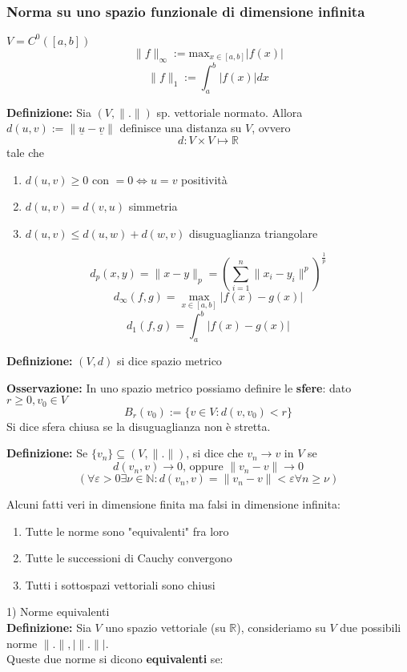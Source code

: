 \documentclass[a4paper]{article}
\newcommand{\R}{\mathbb{R}}
\newcommand{\N}{\mathbb{N}}
\begin{document}
\subsubsection{Norma su uno spazio funzionale di dimensione infinita}
$V=C^0([a,b])$
\[\|f\|_\infty:=\text{max}_{x\in[a,b]}|f(x)|\]
\[\|f\|_1:=\int_{a}^{b} |f(x)|dx\]
\begin{tcolorbox}	
\textbf{Definizione:} Sia $(V,\|.\|)$ sp. vettoriale normato. Allora $d(u,v):=\|\underline{u}-\underline{v}\|$ definisce una distanza su $V$, ovvero
\[d:V\times V\mapsto \R\]
tale che
\begin{enumerate}
	\item $d(u,v)\ge 0$ con $=0\iff u=v$ positività
	\item $d(u,v)=d(v,u)$ simmetria
	\item $d(u,v)\le d(u,w)+d(w,v)$ disuguaglianza triangolare
\end{enumerate}
\end{tcolorbox}
\[d_p(x,y)=\|x-y\|_p=(\sum_{i=1}^{n} \|x_i-y_i\|^p)^{\frac{1}{p}}\]
\[d_\infty(f,g)=\max_{x\in[a,b]}|f(x)-g(x)|\]
\[d_1(f,g)=\int_{a}^{b} |f(x)-g(x)|\]
\begin{tcolorbox}
	\textbf{Definizione:} $(V,d)$ si dice spazio metrico
\end{tcolorbox}
\textbf{Osservazione:} In uno spazio metrico possiamo definire le \textbf{sfere}: dato $r\ge 0,v_0\in V$
\[B_r(v_0):=\{v\in V:d(v,v_0)<r\} \]
Si dice sfera chiusa se la disuguaglianza non è stretta.\\
\begin{tcolorbox}	
\textbf{Definizione:} Se $\{v_n\} \subseteq  (V,\|.\|)$, si dice che $v_n\to v$ in $V$ se
\[d(v_n,v)\to 0\text{, oppure }\|v_n-v\|\to 0\]
\[(\forall \varepsilon>0\exists \nu\in\N:d(v_n,v)=\|v_n-v\|<\varepsilon\forall n\ge \nu)\]
\end{tcolorbox}
Alcuni fatti veri in dimensione finita ma falsi in dimensione infinita:
\begin{enumerate}
	\item Tutte le norme sono "equivalenti" fra loro
	\item Tutte le successioni di Cauchy convergono
	\item Tutti i sottospazi vettoriali sono chiusi
\end{enumerate}
1) Norme equivalenti\\
\textbf{Definizione:} Sia $V$ uno spazio vettoriale (su $\R$), consideriamo su $V$ due possibili norme $ \|.\|,|\|.\||$.
\\Queste due norme si dicono \textbf{equivalenti} se:
\end{document}
